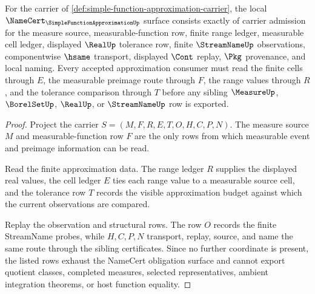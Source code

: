 \begin{theorem}
\label{thm:simple-function-approximation-namecert-obligations}
For the carrier of \autoref{def:simple-function-approximation-carrier}, the local $\NameCert_{\SimpleFunctionApproximationUp}$ surface consists exactly of carrier admission for the measure source, measurable-function row, finite range ledger, measurable cell ledger, displayed $\RealUp$ tolerance row, finite $\StreamNameUp$ observations, componentwise $\hsame$ transport, displayed $\Cont$ replay, $\Pkg$ provenance, and local naming. Every accepted approximation consumer must read the finite cells through $E$, the measurable preimage route through $F$, the range values through $R$, and the tolerance comparison through $T$ before any sibling $\MeasureUp$, $\BorelSetUp$, $\RealUp$, or $\StreamNameUp$ row is exported.
\end{theorem}
\begin{proof}
Project the carrier $S=(M,F,R,E,T,O,H,C,P,N)$. The measure source $M$ and measurable-function row $F$ are the only rows from which measurable event and preimage information can be read.

Read the finite approximation data. The range ledger $R$ supplies the displayed real values, the cell ledger $E$ ties each range value to a measurable source cell, and the tolerance row $T$ records the visible approximation budget against which the current observations are compared.

Replay the observation and structural rows. The row $O$ records the finite StreamName probes, while $H,C,P,N$ transport, replay, source, and name the same route through the sibling certificates. Since no further coordinate is present, the listed rows exhaust the NameCert obligation surface and cannot export quotient classes, completed measures, selected representatives, ambient integration theorems, or host function equality.
\end{proof}


